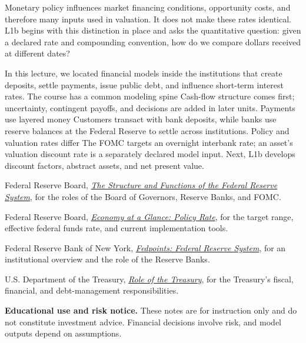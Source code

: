 \documentclass[11pt]{article}
\begin{document}
Monetary policy influences market financing conditions, opportunity costs, and therefore many inputs used in valuation. It does not make these rates identical. L1b begins with this distinction in place and asks the quantitative question: given a declared rate and compounding convention, how do we compare dollars received at different dates?

\thispagestyle{fancy}
\keytakeaways
  {In this lecture, we located financial models inside the institutions that create deposits, settle payments, issue public debt, and influence short-term interest rates.}
  {The course has a common modeling spine}
  {Cash-flow structure comes first; uncertainty, contingent payoffs, and decisions are added in later units.}
  {Payments use layered money}
  {Customers transact with bank deposits, while banks use reserve balances at the Federal Reserve to settle across institutions.}
  {Policy and valuation rates differ}
  {The FOMC targets an overnight interbank rate; an asset's valuation discount rate is a separately declared model input.}
  {Next, L1b develops discount factors, abstract assets, and net present value.}

\begin{readinglist}
  \item Federal Reserve Board, \href{https://www.federalreserve.gov/aboutthefed/structure-federal-reserve-system.htm}{\emph{The Structure and Functions of the Federal Reserve System}}, for the roles of the Board of Governors, Reserve Banks, and FOMC.
  \item Federal Reserve Board, \href{https://www.federalreserve.gov/economy-at-a-glance-policy-rate.htm}{\emph{Economy at a Glance: Policy Rate}}, for the target range, effective federal funds rate, and current implementation tools.
  \item Federal Reserve Bank of New York, \href{https://www.newyorkfed.org/aboutthefed/fedpoint/fed01.html}{\emph{Fedpoints: Federal Reserve System}}, for an institutional overview and the role of the Reserve Banks.
  \item U.S. Department of the Treasury, \href{https://home.treasury.gov/about/general-information/role-of-the-treasury}{\emph{Role of the Treasury}}, for the Treasury's fiscal, financial, and debt-management responsibilities.
\end{readinglist}

\vfill
{\sffamily\footnotesize\color{vnmuted}\textbf{Educational use and risk notice.} These notes are for instruction only and do not constitute investment advice. Financial decisions involve risk, and model outputs depend on assumptions.}
\end{document}
